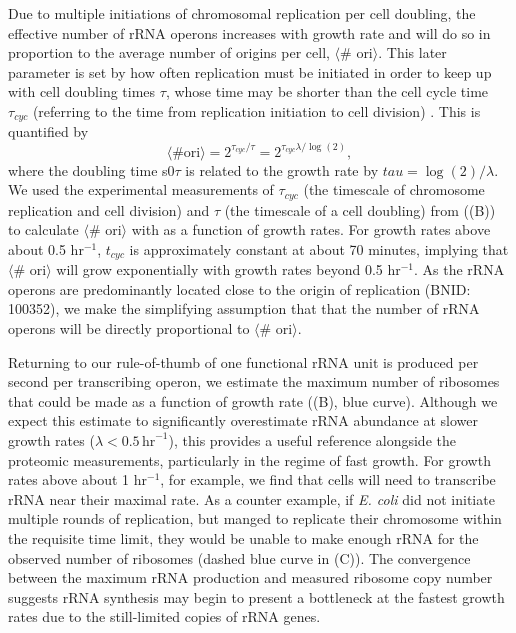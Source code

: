 Due to multiple initiations of chromosomal replication per cell doubling, the
effective number of rRNA operons increases with growth rate and will do so in
proportion to the average number of origins per cell, $\langle$\# ori$\rangle$.
This later parameter is set by how often replication must be initiated in order
to keep up with cell doubling times $\tau$, whose time may be shorter than the
cell cycle time $\tau_{cyc}$ (referring to the time from replication initiation to
cell division) \citep{dennis2004, ho2015}. This is quantified by
\begin{equation}
    \langle \text{\# ori} \rangle = 2^{\tau_{cyc} / \tau} = 2^{\tau_{cyc} \lambda / \log(2)},
    \label{eq:Nori}
\end{equation}
where the doubling time s0$\tau$ is related to the growth rate by $tau =
\log(2)/\lambda$. We used the experimental measurements of $\tau_{cyc}$ (the
timescale of chromosome replication and cell division) and $\tau$ (the timescale
of a cell doubling) from \cite{si2017}
((B)) to calculate $\langle$\#
ori$\rangle$  with  as a function of growth rates. For growth rates
above about 0.5 hr$^{-1}$, $t_{cyc}$ is approximately constant at about 70
minutes, implying that $\langle$\# ori$\rangle$ will grow exponentially with
growth rates beyond 0.5 hr$^{-1}$. As the rRNA operons are predominantly located
close to the origin of replication (BNID: 100352), we make the simplifying
assumption that that the number of rRNA operons  will be directly proportional
to $\langle$\# ori$\rangle$.

Returning to our rule-of-thumb of one functional rRNA unit is produced per second per
transcribing operon, we estimate the maximum number of ribosomes that could be
made as a function of growth rate ((B), blue curve).
Although we expect this estimate to significantly overestimate rRNA abundance at
slower growth rates ($\lambda < 0.5\, \text{hr}^{-1}$), this provides a useful
reference alongside the proteomic measurements, particularly in the regime of
fast growth. For growth rates above about 1 hr$^{-1}$, for example, we find that
cells will need to transcribe rRNA near their maximal rate. As a counter
example, if \textit{E. coli} did not initiate multiple rounds of replication,
but manged to replicate their chromosome within the requisite time limit, they
would be unable to make enough rRNA for the observed number of ribosomes (dashed
blue curve in (C)). The convergence between the maximum rRNA
production and measured ribosome copy number suggests rRNA synthesis may begin
to present a bottleneck at the fastest growth rates due to the still-limited
copies of rRNA genes.
